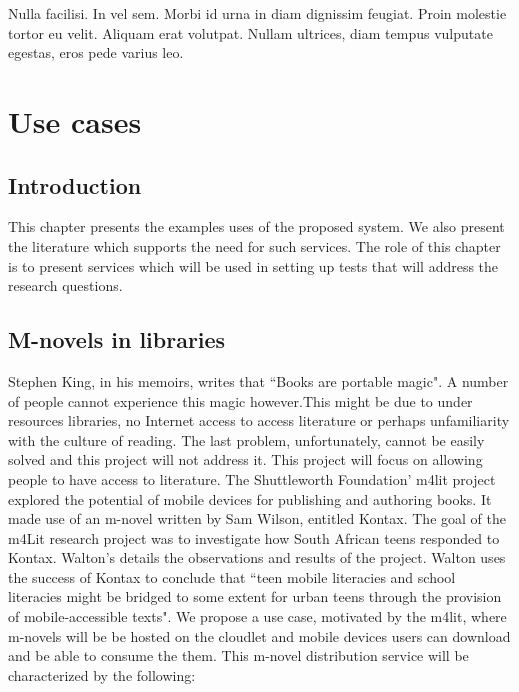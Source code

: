 \newcommand{\RNum}[1]{\uppercase\expandafter{\romannumeral #1\relax}}

\begin{savequote}[75mm] 
Nulla facilisi. In vel sem. Morbi id urna in diam dignissim feugiat. Proin molestie tortor eu velit. Aliquam erat volutpat. Nullam ultrices, diam tempus vulputate egestas, eros pede varius leo.
\end{savequote}

\chapter{Use cases}
\label{chapterfive}

\section{Introduction}
This chapter presents the examples uses of the proposed system. We also present the literature which supports the need for such services. The role of this chapter is to present services which will be used in setting up tests that will address the research questions.

\section{M-novels in libraries}
Stephen King, in his memoirs, writes that ``Books are portable magic"\cite[p. 96]{king2000writing}. A number of people cannot experience this magic however.This might be due to under resources libraries, no Internet access to access literature or perhaps unfamiliarity with the culture of reading. The last problem, unfortunately, cannot be easily solved and this project will not address it. This project will focus on allowing people to have access to literature. The Shuttleworth Foundation' m4lit project explored the potential of mobile devices for publishing and authoring books. It made use of an m-novel
written by Sam Wilson, entitled Kontax. The goal of the m4Lit research project
was to investigate how South African teens responded to Kontax. Walton's\cite{walton2010mobile} details the observations and results of the project. Walton\cite{walton2010mobile} uses the success of Kontax to conclude that ``teen mobile literacies and school literacies might be bridged to some extent for urban teens through the provision of mobile-accessible texts"\cite[p. \RNum{7}]{walton2010mobile}. We propose a use case, motivated by the m4lit, where m-novels will be be hosted on the cloudlet and mobile devices users can download and be able to consume the them. This m-novel distribution service will be characterized by the following:

